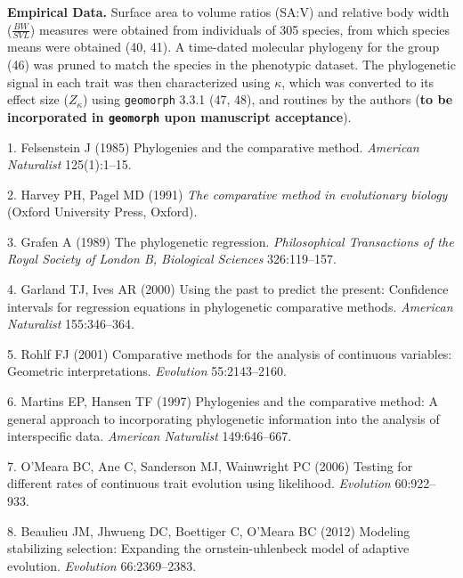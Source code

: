 \documentclass[9pt,twocolumn,twoside,lineno]{pnas-new}
\begin{document}
\textbf{Empirical Data.} Surface area to volume ratios (SA:V) and
relative body width (\(\frac{BW}{SVL}\)) measures were obtained from
individuals of 305 species, from which species means were obtained (40,
41). A time-dated molecular phylogeny for the group (46) was pruned to
match the species in the phenotypic dataset. The phylogenetic signal in
each trait was then characterized using \(\kappa\), which was converted
to its effect size (\(Z_\kappa\)) using \texttt{geomorph} 3.3.1 (47,
48), and routines by the authors (\textbf{to be incorporated in
\texttt{geomorph} upon manuscript acceptance}).

\showmatmethods
\showacknow
\pnasbreak

\hypertarget{refs}{}
\leavevmode\hypertarget{ref-Felsenstein1985}{}%
1. Felsenstein J (1985) Phylogenies and the comparative method.
\emph{American Naturalist} 125(1):1--15.

\leavevmode\hypertarget{ref-HarveyPagel1991}{}%
2. Harvey PH, Pagel MD (1991) \emph{The comparative method in
evolutionary biology} (Oxford University Press, Oxford).

\leavevmode\hypertarget{ref-Grafen1989}{}%
3. Grafen A (1989) The phylogenetic regression. \emph{Philosophical
Transactions of the Royal Society of London B, Biological Sciences}
326:119--157.

\leavevmode\hypertarget{ref-GarlandIves2000}{}%
4. Garland TJ, Ives AR (2000) Using the past to predict the present:
Confidence intervals for regression equations in phylogenetic
comparative methods. \emph{American Naturalist} 155:346--364.

\leavevmode\hypertarget{ref-Rohlf2001}{}%
5. Rohlf FJ (2001) Comparative methods for the analysis of continuous
variables: Geometric interpretations. \emph{Evolution} 55:2143--2160.

\leavevmode\hypertarget{ref-MartinsHansen1997}{}%
6. Martins EP, Hansen TF (1997) Phylogenies and the comparative method:
A general approach to incorporating phylogenetic information into the
analysis of interspecific data. \emph{American Naturalist} 149:646--667.

\leavevmode\hypertarget{ref-OMeara_et_al2006}{}%
7. O'Meara BC, Ane C, Sanderson MJ, Wainwright PC (2006) Testing for
different rates of continuous trait evolution using likelihood.
\emph{Evolution} 60:922--933.

\leavevmode\hypertarget{ref-Beaulieu_et_al2012}{}%
8. Beaulieu JM, Jhwueng DC, Boettiger C, O'Meara BC (2012) Modeling
stabilizing selection: Expanding the ornstein-uhlenbeck model of
adaptive evolution. \emph{Evolution} 66:2369--2383.
\end{document}
